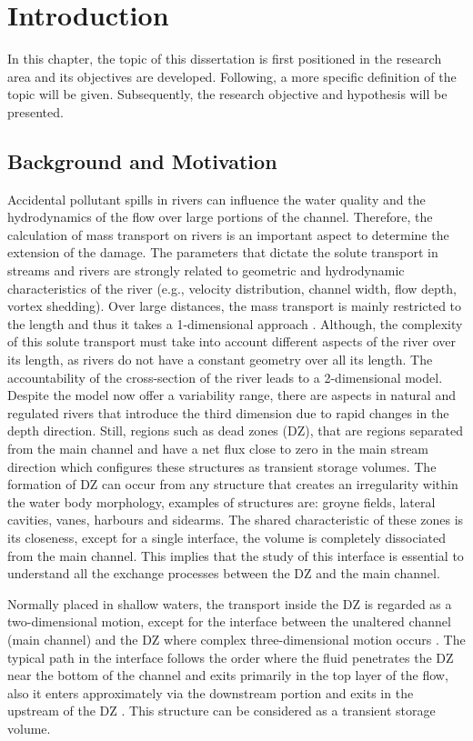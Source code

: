 \chapter{Introduction}
\label{chap:introduction}
In this chapter, the topic of this dissertation is first positioned in the research area and its objectives are developed. Following, a more specific definition of the topic will be given. Subsequently, the research objective and hypothesis will be presented.
\section{Background and Motivation}

Accidental pollutant spills in rivers can influence the water quality and the hydrodynamics of the flow over large portions of the channel. Therefore, the calculation of mass transport on rivers is an important aspect to determine the extension of the damage. The parameters that dictate the solute transport in streams and rivers are strongly related to geometric and hydrodynamic characteristics of the river (e.g., velocity distribution, channel width, flow depth, vortex shedding). Over large distances, the mass transport is mainly restricted to the length and thus it takes a 1-dimensional approach \cite{weitbrecht2004}. Although, the complexity of this solute transport must take into account different aspects of the river over its length, as rivers do not have a constant geometry over all its length. The accountability of the cross-section of the river leads to a 2-dimensional model. Despite the model now offer a variability range, there are aspects in natural and regulated rivers that introduce the third dimension due to rapid changes in the depth direction. Still, regions such as dead zones (DZ), that are regions separated from the main channel and have a net flux close to zero in the main stream direction which configures these structures as transient storage volumes. The formation of DZ can occur from any structure that creates an irregularity within the water body morphology, examples of structures are: groyne fields, lateral cavities, vanes, harbours and sidearms. The shared characteristic of these zones is its closeness, except for a single interface, the volume is completely dissociated from the main channel. This implies that the study of this interface is essential to understand all the exchange processes between the DZ and the main channel.

Normally placed in shallow waters, the transport inside the DZ is regarded as a two-dimensional motion, except for the interface between the unaltered channel (main channel) and the DZ where complex three-dimensional motion occurs \cite{xiang2020}. The typical path in the interface follows the order where the fluid penetrates the DZ near the bottom of the channel and exits primarily in the top layer of the flow, also it enters approximately via the downstream portion and exits in the upstream of the DZ \cite{weitbrecht2004,xiang2020}. This structure can be considered as a transient storage volume.

